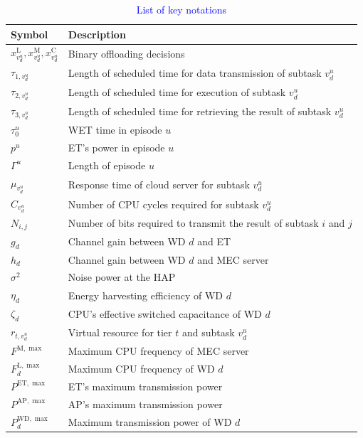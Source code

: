 \documentclass[12pt,draftclsnofoot,onecolumn]{IEEEtran}
\newcommand{\rev}[1]{{\color{blue}#1}} %
\newcommand{\rev}[1]{#1}
\newenvironment{my}[2]%
{\begin{list}{}%
{\setlength{\rightmargin}{#1}\setlength{\leftmargin}{#2}}%


 \item[]{}

} {\end{list}}
\begin{document}
\begin{enumerate}
\begin{my}{0cm}{0cm}
	\rev{
		\begin{table}[h]
			\centering
			\caption{\textcolor{blue}{List of key notations}}
			\label{table2}
			{\color{blue}\begin{tabular}{ |p{2cm}|p{12cm}|  }
				\hline
				\textbf{Symbol} & \textbf{Description} \\
				\hline
				$x^{\text{L}}_{v_d^u}, x^{\text{M}}_{v_d^u}, x^{\text{C}}_{v_d^u}$ & Binary offloading decisions \\
				$\tau_{1,v_d^u}$ & Length of scheduled time for data transmission of subtask $v_d^u$ \\
				$\tau_{2,v_d^u}$ & Length of scheduled time for execution of subtask $v_d^u$\\
				$\tau_{3,v_d^u}$ & Length of scheduled time for retrieving the result of subtask $v_d^u$ \\
				$\tau_0^u$ & WET time in episode $u$\\
				$p^{u}$ & ET's power in episode $u$ \\
				$\Gamma^u$ & Length of episode $u$ \\
				$\mu_{v_d^u}$ & Response time of cloud server for subtask $v_d^u$ \\
				$C_{v_d^u}$ & Number of CPU cycles required for subtask $v_d^u$ \\
				$N_{i,j}$ & Number of bits required to transmit the result of subtask $i$ and $j$ \\
				$g_d$ & Channel gain between WD $d$ and ET \\
				$h_d$ & Channel gain between WD $d$ and MEC server \\
				$\sigma^2$ & Noise power at the HAP \\
				$\eta_d$ & Energy harvesting efficiency of WD $d$ \\
				$\zeta_{d}$ & CPU's effective switched capacitance of WD $d$ \\
				$r_{t,v_d^u}$ & Virtual resource for tier $t$ and subtask $v_d^u$ \\
				$F^{\text{M},\max}$ & Maximum CPU frequency of MEC server \\
				$F^{\text{L},\max}_{d}$ & Maximum CPU frequency of WD $d$ \\
				$P^{\text{ET},\max}$ & ET's maximum transmission power \\
				$P^{\text{AP},\max}$ & AP's maximum transmission power \\
				$P^{\text{WD},\max}_d$ & Maximum transmission power of WD $d$ \\

\end{tabular}}
\end{table}}
\end{my}
\end{enumerate}
\end{document}
